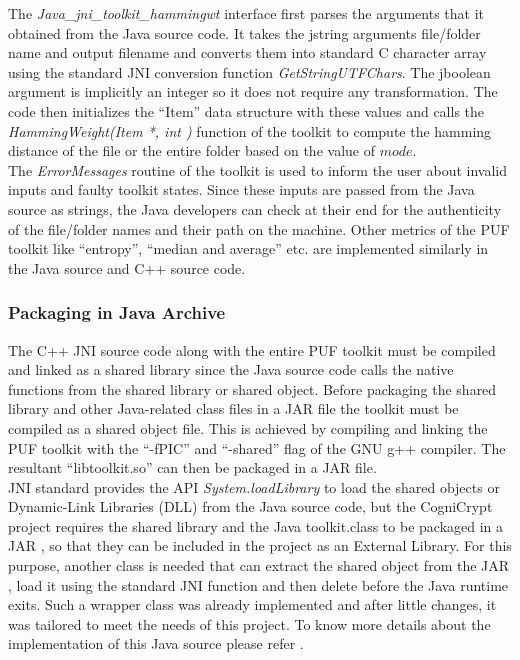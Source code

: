 The \emph{Java\_jni\_toolkit\_hammingwt} interface first parses the arguments that it obtained from the Java source code. It takes the jstring arguments file/folder name and output filename and converts them into standard C character array using the standard JNI conversion function \emph{GetStringUTFChars}. The jboolean argument is implicitly an integer so it does not require any transformation. The code then initializes the ``Item'' data structure with these values and calls the \emph{HammingWeight(Item *, int )} function of the toolkit to compute the hamming distance of the file or the entire folder based on the value of $mode$.\\ 

The \emph{ErrorMessages} routine of the toolkit is used to inform the user about invalid inputs and faulty toolkit states. Since these inputs are passed from the Java source as strings, the Java developers can check at their end for the authenticity of the file/folder names and their path on the machine. Other metrics of the PUF toolkit like ``entropy'', ``median and average'' etc. are implemented similarly in the Java source and C++ source code.\\

\subsubsection{Packaging in Java Archive}
The C++ JNI source code along with the entire PUF toolkit must be compiled and linked as a shared library since the Java source code calls the native functions from the shared library or shared object. Before packaging the shared library and other Java-related class files in a JAR file the toolkit must be compiled as a shared object file. This is achieved by compiling and linking the PUF toolkit with the
``-fPIC'' and ``-shared'' flag of the GNU g++ compiler. The resultant ``libtoolkit.so'' can then be packaged in a JAR file.\\

JNI standard provides the API \emph{System.loadLibrary} to load the shared objects or Dynamic-Link Libraries (DLL) from the Java source code, but the CogniCrypt project requires the shared library and the Java toolkit.class to be packaged in a JAR , so that they can be included in the project as an External Library. For this purpose, another class is needed that can extract the shared object from the JAR , load it using the standard JNI function and then delete before the Java runtime exits. Such
a wrapper class was already implemented and after little changes, it was tailored to meet the needs of this project. To know more details about the implementation of this Java source please refer \cite{nativeutils}.\\

